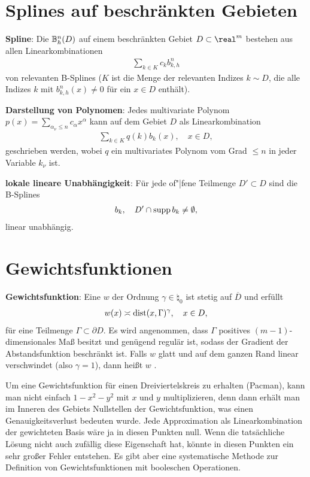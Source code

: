 \section{%
    Splines auf beschränkten Gebieten%
}

\textbf{Spline}:
Die  $\mathbb{B}_h^n(D)$ auf einem beschränkten Gebiet $D \subset \real^m$ bestehen aus
allen Linearkombinationen
\begin{align*}
    \sum_{k \in K} c_k b_{k,h}^n
\end{align*}
von relevanten B-Splines ($K$ ist die Menge der relevanten Indizes $k \sim D$, die alle
Indizes $k$ mit
$b_{k,h}^n(x) \not= 0$ für ein $x \in D$ enthält).

\textbf{Darstellung von Polynomen}:
Jedes multivariate Polynom $p(x) = \sum_{\alpha_\nu \le n} c_\alpha x^\alpha$ kann auf dem Gebiet
$D$ als Linearkombination
\begin{align*}
    \sum_{k \in K} q(k) b_k(x),\quad
    x \in D,
\end{align*}
geschrieben werden, wobei $q$ ein multivariates Polynom vom Grad $\le n$ in jeder Variable $k_\nu$
ist.

\textbf{lokale lineare Unabhängigkeit}:
Für jede of"|fene Teilmenge $D' \subset D$ sind die B-Splines
\begin{align*}
    b_k,\quad
    D' \cap \operatorname{supp} b_k \not= \emptyset,
\end{align*}
linear unabhängig.

\pagebreak

\section{%
    Gewichtsfunktionen%
}

\textbf{Gewichtsfunktion}:
Eine  $w$
der Ordnung $\gamma \in \natural_0$ ist stetig auf $\overline{D}$ und erfüllt
\begin{align*}
    w(x) \asymp \operatorname{dist}(x, \Gamma)^\gamma,\quad
    x \in D,
\end{align*}
für eine Teilmenge $\Gamma \subset \partial D$.
Es wird angenommen, dass $\Gamma$ positives $(m - 1)$-dimensionales Maß besitzt und genügend
regulär ist, sodass der Gradient der Abstandsfunktion beschränkt ist.
Falls $w$ glatt und auf dem ganzen Rand linear verschwindet (also $\gamma = 1$),
dann heißt $w$ .

Um eine Gewichtsfunktion für einen Dreiviertelskreis zu erhalten (Pacman), kann man nicht einfach
$1 - x^2 - y^2$ mit $x$ und $y$ multiplizieren, denn dann erhält man im Inneren des Gebiets
Nullstellen der Gewichtsfunktion, was einen Genauigkeitsverlust bedeuten wurde.
Jede Approximation als Linearkombination der gewichteten Basis wäre ja in diesen Punkten null.
Wenn die tatsächliche Lösung nicht auch zufällig diese Eigenschaft hat, könnte in diesen Punkten
ein sehr großer Fehler entstehen.
Es gibt aber eine systematische Methode zur Definition von Gewichtsfunktionen mit booleschen
Operationen.

